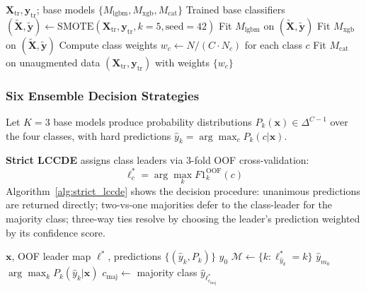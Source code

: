 \documentclass[11pt,a4paper]{article}
\begin{document}
\begin{algorithm}[ht]
\caption{SMOTE Training Pipeline}
\label{alg:smote}
\begin{algorithmic}[1]
\REQUIRE $\mathbf{X}_{\text{tr}}, \mathbf{y}_{\text{tr}}$; base models $\{M_{\text{lgbm}}, M_{\text{xgb}}, M_{\text{cat}}\}$
\ENSURE Trained base classifiers
\STATE $(\tilde{\mathbf{X}}, \tilde{\mathbf{y}}) \leftarrow \text{SMOTE}(\mathbf{X}_{\text{tr}}, \mathbf{y}_{\text{tr}}, k{=}5, \text{seed}{=}42)$
\STATE Fit $M_{\text{lgbm}}$ on $(\tilde{\mathbf{X}}, \tilde{\mathbf{y}})$
\STATE Fit $M_{\text{xgb}}$ on $(\tilde{\mathbf{X}}, \tilde{\mathbf{y}})$
\STATE Compute class weights $w_c \leftarrow N/(C \cdot N_c)$ for each class $c$
\STATE Fit $M_{\text{cat}}$ on unaugmented data $(\mathbf{X}_{\text{tr}}, \mathbf{y}_{\text{tr}})$ with weights $\{w_c\}$
\end{algorithmic}
\end{algorithm}

\subsubsection{Six Ensemble Decision Strategies}

Let $K=3$ base models produce probability distributions $P_k(\mathbf{x}) \in \Delta^{C-1}$ over the
four classes, with hard predictions $\hat{y}_k = \arg\max_c P_k(c|\mathbf{x})$.

\textbf{Strict LCCDE} assigns class leaders via 3-fold OOF
cross-validation:
\begin{equation}
  \ell^*_c = \arg\max_k F1_k^{\text{OOF}}(c)
  \label{eq:strict_lccde_leader}
\end{equation}
Algorithm~\ref{alg:strict_lccde} shows the decision procedure: unanimous predictions are returned directly; two-vs-one majorities
defer to the class-leader for the majority class; three-way ties resolve by choosing the leader's
prediction weighted by its confidence score.

\begin{algorithm}[ht]
\caption{Strict LCCDE Decision}
\label{alg:strict_lccde}
\begin{algorithmic}[1]
\REQUIRE $\mathbf{x}$, OOF leader map $\boldsymbol{\ell}^*$, predictions $\{(\hat{y}_k, P_k)\}$
  \RETURN $\hat{y}_0$
  \STATE $\mathcal{M} \leftarrow \{k : \ell^*_{\hat{y}_k} = k\}$
   \RETURN $\hat{y}_{m_0}$
  \ELSE \RETURN $\arg\max_k P_k(\hat{y}_k|\mathbf{x})$
  \ENDIF
\ELSE
  \STATE $c_{\text{maj}} \leftarrow$ majority class
  \RETURN $\hat{y}_{\ell^*_{c_{\text{maj}}}}$
\ENDIF
\end{algorithmic}
\end{algorithm}
\end{document}
